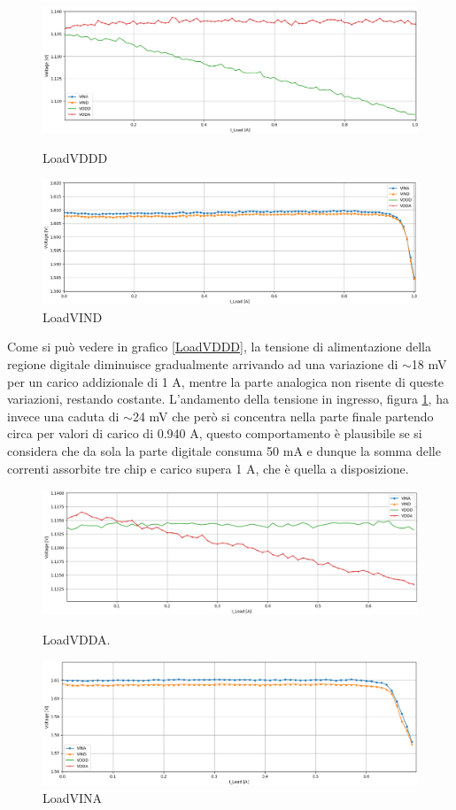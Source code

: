 \begin{figure}
\centering
\includegraphics[scale=.3]{Immagini/LoadVDDD}
\caption{LoadVDDD}
\label{LoadVDDD}
\includegraphics[scale=.3]{Immagini/LoadVIND}
\caption{LoadVIND}
\label{LoadVIND}
\end{figure}
Come si può vedere in grafico \ref{LoadVDDD}, la tensione di alimentazione della regione digitale diminuisce gradualmente arrivando ad una variazione di $\sim$18 mV per un carico addizionale di 1 A, mentre la parte analogica non risente di queste variazioni, restando costante. 
L'andamento della tensione in ingresso, figura \ref{LoadVIND}, ha invece una caduta di $\sim$24 mV che però si concentra nella parte finale partendo circa per valori di carico di 0.940 A, questo comportamento è plausibile se si considera che da sola la parte digitale consuma 50 mA e dunque la somma delle correnti assorbite tre chip e carico supera 1 A, che è quella a disposizione. 
\begin{figure}
\centering
\includegraphics[scale=.3]{Immagini/LoadVDDA}
\caption{LoadVDDA.}
\label{LoadVDDA}
\includegraphics[scale=.3]{Immagini/LoadVINA}
\caption{LoadVINA}
\label{LoadVINA}
\end{figure}
